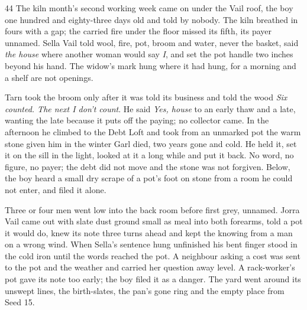 
\scenebreak


\scenebreak


\scenebreak

\CRtailpiece
\begin{CRchronicle}{44}
The kiln month’s second working week came on under the Vail roof, the boy one hundred and eighty-three days old and told by nobody. The kiln breathed in fours with a gap; the carried fire under the floor missed its fifth, its payer unnamed. Sella Vail told wool, fire, pot, broom and water, never the basket, said \emph{the house} where another woman would say \emph{I}, and set the pot handle two inches beyond his hand. The widow’s mark hung where it had hung, for a morning and a shelf are not openings.

Tarn took the broom only after it was told its business and told the wood \emph{Six counted. The next I don’t count}. He said \emph{Yes, house} to an early thaw and a late, wanting the late because it puts off the paying; no collector came. In the afternoon he climbed to the Debt Loft and took from an unmarked pot the warm stone given him in the winter Garl died, two years gone and cold. He held it, set it on the sill in the light, looked at it a long while and put it back. No word, no figure, no payer; the debt did not move and the stone was not forgiven. Below, the boy heard a small dry scrape of a pot’s foot on stone from a room he could not enter, and filed it alone.

Three or four men went low into the back room before first grey, unnamed. Jorra Vail came out with slate dust ground small as meal into both forearms, told a pot it would do, knew its note three turns ahead and kept the knowing from a man on a wrong wind. When Sella’s sentence hung unfinished his bent finger stood in the cold iron until the words reached the pot. A neighbour asking a cost was sent to the pot and the weather and carried her question away level. A rack-worker’s pot gave its note too early; the boy filed it as a danger. The yard went around its unswept lines, the birth-slates, the pan’s gone ring and the empty place from Seed 15.


\end{CRchronicle}
